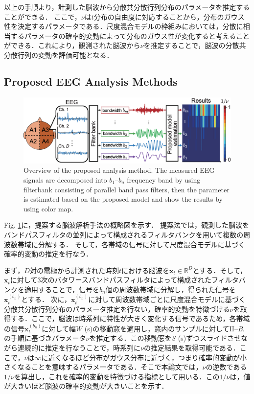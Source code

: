 \documentclass[journal]{IEEEtran}
\begin{document}
以上の手順より，計測した脳波から分散共分散行列分布のパラメータを推定することができる．
ここで，$\nu$は$t$分布の自由度に対応することから，分布のガウス性を決定するパラメータである．尺度混合モデルの枠組みにおいては，分散に相当するパラメータの確率的変動によって分布のガウス性が変化すると考えることができる．これにより，観測された脳波から$\nu$を推定することで，脳波の分散共分散行列の変動を評価可能となる．

\subsection{Proposed EEG Analysis Methods}
\begin{figure}[!ht]
\centering
\includegraphics[width=0.95\hsize]{figure/system_3.eps}
\caption{Overview of the proposed analysis method. The measured EEG signals are decomposed into $b_1$--$b_n$ frequency band by using filterbank consisting of parallel band pass filters, then the parameter is estimated based on the proposed model and show the results by using color map.}
\label{fig:system}
\end{figure}
Fig. \ref{fig:system}に，提案する脳波解析手法の概略図を示す．
提案法では，観測した脳波をバンドパスフィルタの並列によって構成されるフィルタバンクを用いて複数の周波数帯域に分解する．
そして，各帯域の信号に対して尺度混合モデルに基づく確率的変動の推定を行なう．

まず，$D$対の電極から計測された時刻$t$における脳波を$\mathbf{x}_t \in \mathbb{R}^D$とする．そして，$\mathbf{x}_t$に対して3次のバタワースバンドパスフィルタによって構成されたフィルタバンクを適用することで，信号を$b_n$個の周波数帯域に分解し，得られた信号を$\mathbf{x}^{(b_n)}_t$とする．
次に，$\mathbf{x}^{(b_n)}_t$に対して周波数帯域ごとに尺度混合モデルに基づく分散共分散行列分布のパラメータ推定を行ない，確率的変動を特徴づける$\nu$を取得する．ここで，脳波は時系列に特性が大きく変化する信号であるため，各帯域の信号$\mathbf{x}^{(b_n)}_t$に対して幅$W$ (s)の移動窓を適用し，窓内のサンプルに対してII--\textit{B}.の手順に基づきパラメータ$\nu$を推定する．この移動窓を$S$ (s)ずつスライドさせながら連続的に推定を行なうことで，時系列に$\nu$の推定結果を取得可能である．ここで，$\nu$は$\infty$に近くなるほど分布がガウス分布に近づく，つまり確率的変動が小さくなることを意味するパラメータである．そこで本論文では，$\nu$の逆数である$1/\nu$を算出し，これを確率的変動を特徴づける指標として用いる．この$1/\nu$は，値が大きいほど脳波の確率的変動が大きいことを示す．
\end{document}
